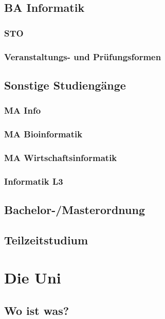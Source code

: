 \documentclass[12pt,a4paper]{article}
\begin{document}
	\subsection{BA Informatik}
			\subsubsection{STO}
			\subsubsection{Veranstaltungs- und Prüfungsformen}
	\subsection{Sonstige Studiengänge}
		\subsubsection{MA Info}
		\subsubsection{MA Bioinformatik}
		\subsubsection{MA Wirtschaftsinformatik}
		\subsubsection{Informatik L3}
	
	\subsection{Bachelor-/Masterordnung}

	\subsection{Teilzeitstudium}
	
\newpage
\section{Die Uni}
	\subsection{Wo ist was?}
\end{document}
